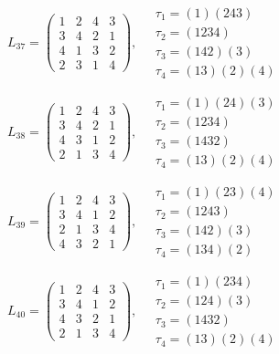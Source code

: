 $L_{37} = \begin{pmatrix} 1 & 2 & 4 & 3 \\ 3 & 4 & 2 & 1 \\ 4 & 1 & 3 & 2 \\ 2 & 3 & 1 & 4 \end{pmatrix}, \quad \begin{matrix} \tau_{1} = (1)(2 4 3) \\ \tau_{2} = (1 2 3 4) \\ \tau_{3} = (1 4 2)(3) \\ \tau_{4} = (1 3)(2)(4) \end{matrix}$

$L_{38} = \begin{pmatrix} 1 & 2 & 4 & 3 \\ 3 & 4 & 2 & 1 \\ 4 & 3 & 1 & 2 \\ 2 & 1 & 3 & 4 \end{pmatrix}, \quad \begin{matrix} \tau_{1} = (1)(2 4)(3) \\ \tau_{2} = (1 2 3 4) \\ \tau_{3} = (1 4 3 2) \\ \tau_{4} = (1 3)(2)(4) \end{matrix}$

$L_{39} = \begin{pmatrix} 1 & 2 & 4 & 3 \\ 3 & 4 & 1 & 2 \\ 2 & 1 & 3 & 4 \\ 4 & 3 & 2 & 1 \end{pmatrix}, \quad \begin{matrix} \tau_{1} = (1)(2 3)(4) \\ \tau_{2} = (1 2 4 3) \\ \tau_{3} = (1 4 2)(3) \\ \tau_{4} = (1 3 4)(2) \end{matrix}$

$L_{40} = \begin{pmatrix} 1 & 2 & 4 & 3 \\ 3 & 4 & 1 & 2 \\ 4 & 3 & 2 & 1 \\ 2 & 1 & 3 & 4 \end{pmatrix}, \quad \begin{matrix} \tau_{1} = (1)(2 3 4) \\ \tau_{2} = (1 2 4)(3) \\ \tau_{3} = (1 4 3 2) \\ \tau_{4} = (1 3)(2)(4) \end{matrix}$

